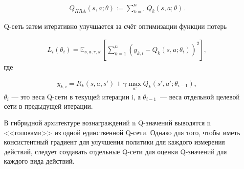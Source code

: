 \begin{equation}
    \begin{multlined}
        Q_{H R A}(s, a; \theta) := \sum^n_{k=1} Q_k(s, a;\theta).
    \end{multlined}
\end{equation}

Q-сеть затем итеративно улучшается за счёт оптимизации функции потерь

\begin{equation}
    \begin{multlined}
        L_i(\theta_i) = \mathbb{E}_{s, a, r, s'}[\sum^n_{k=1}(y_{k, i}-Q_k(s, a;\theta_i))^2],
    \end{multlined}
\end{equation}
где

\begin{equation}
    \begin{multlined}
        y_{k, i} = R_k(s, a, s') + \gamma \max_{a'} Q_k(s', a';\theta_{i-1}),
    \end{multlined}
\end{equation}
$\theta_i$ — это веса Q-сети в текущей итерации i, а $\theta_{i-1}$~--- веса отдельной целевой сети в предыдущей итерации.

В гибридной архитектуре вознаграждений n Q-значений выводятся n <<головами>> из одной единственной Q-сети. Однако для того, чтобы иметь консистентный градиент для улучшения политики для каждого измерения действий, следует создавать отдельные Q-сети для оценки Q-значений для каждого вида действий.
